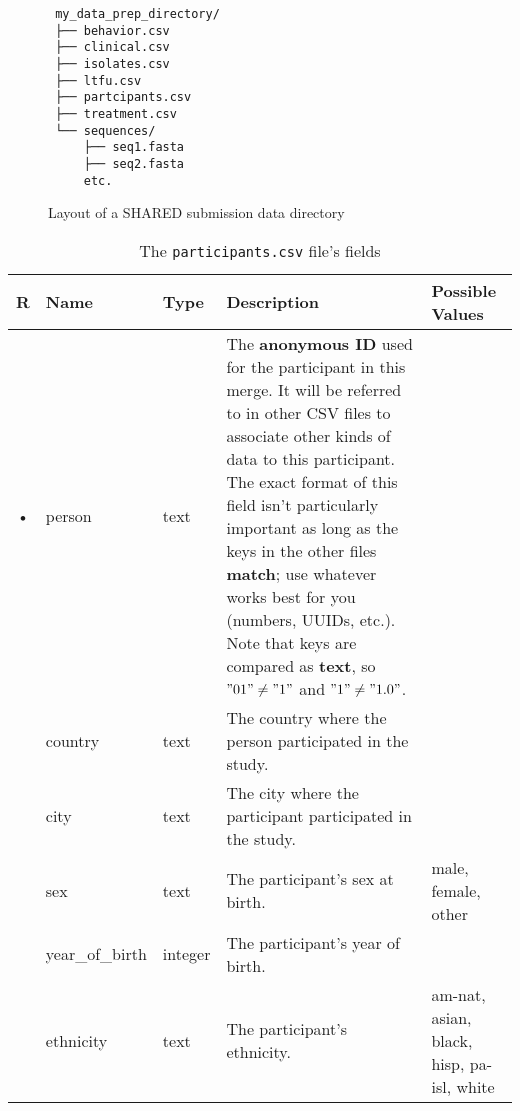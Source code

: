 \documentclass{article}
\begin{document}
\begin{figure}
  \caption{Layout of a SHARED submission data directory}
  \label{fig:data-prep-dir}
\begin{verbatim}
 my_data_prep_directory/
 ├── behavior.csv
 ├── clinical.csv
 ├── isolates.csv
 ├── ltfu.csv
 ├── partcipants.csv
 ├── treatment.csv
 └── sequences/
     ├── seq1.fasta
     ├── seq2.fasta
     etc.
\end{verbatim}
\end{figure}


\begin{table}
  \centering
  \caption{The \texttt{participants.csv} file's fields}
  \label{tbl:participants.csv}
  \begin{tabular}{cllp{6cm}p{4cm}}
    R & Name            & Type      & Description & Possible Values\\ \hline
    • & person          & text    &
      The \textbf{anonymous ID} used for the participant in this
      merge. It will be referred to in other CSV files to associate
      other kinds of data to this participant. The exact format of
      this field isn't particularly important as long as the keys in
      the other files \textbf{match}; use whatever works best for you
      (numbers, UUIDs, etc.). Note that keys are compared as
      \textbf{text}, so $"01" \neq "1"$ and $"1" \neq "1.0"$. 
      \\
      & country         & text    & The country where the person participated in the study. \\
      & city            & text    & The city where the participant participated in the study. \\
      & sex             & text    & The participant's sex at birth.  & male, female, other \\
      & year\_of\_birth & integer   & The participant's year of birth. \\
      & ethnicity       & text    & The participant's ethnicity. & am-nat, asian, black, hisp, pa-isl, white \\
  \end{tabular}
\end{table}
\end{document}

